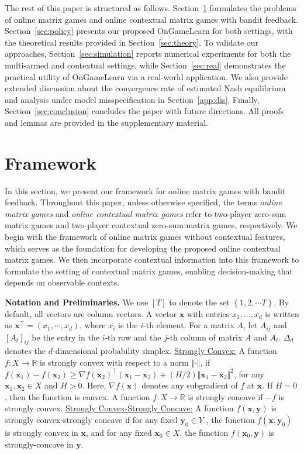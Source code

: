 \documentclass[12pt]{article}
\begin{document}
The rest of this paper is structured as follows. Section~\ref{sec:framework} formulates the problems of online matrix games and online contextual matrix games with bandit feedback. Section~\ref{sec:policy} presents our proposed OnGameLearn for both settings, with the theoretical results provided in Section~\ref{sec:theory}. To validate our approaches, Section~\ref{sec:simulation} reports numerical experiments for both the multi-armed and contextual settings, while Section~\ref{sec:real} demonstrates the practical utility of OnGameLearn via a real-world application. 
We also provide extended discussion about the convergence rate of estimated Nash equilibrium and analysis under model misspecification in Section~\ref{app:dis}.
Finally, Section~\ref{sec:conclusion} concludes the paper with future directions. All proofs and lemmas are provided in the supplementary material.



\section{Framework}
\label{sec:framework}

In this section, we present our framework for online matrix games with bandit feedback. Throughout this paper, unless otherwise specified, the terms \textit{online matrix games} and \textit{online contextual matrix games} refer to two-player zero-sum matrix games and two-player contextual zero-sum matrix games, respectively. We begin with the framework of online matrix games without contextual features, which serves as the foundation for developing the proposed online contextual matrix games. We then incorporate contextual information into this framework to formulate the setting of contextual matrix games, enabling decision-making that depends on observable contexts.

\smallskip
\noindent\textbf{Notation and Preliminaries.} We use $[T]$ to denote the set $\left\{1, 2, \cdots T\right\}$. By default, all vectors are column vectors. A vector $\bm{x}$ with entries $x_1, ..., x_d$ is written as $\bm{x}^\top = (x_1, \cdots, x_d)$, where $x_i$ is the $i$-th element. For a matrix $A$, let $A_{ij}$ and $[A_t]_{ij}$ be the entry in the $i$-th row and the $j$-th column of matrix $A$ and $A_t$. $\Delta_d$ denotes the $d$-dimensional probability simplex. \underline{Strongly Convex:} A function $f:X\rightarrow \mathbb{R}$ is strongly convex with respect to a norm $\Vert \cdot \Vert$, if  $f(\bm{x}_1) - f(\bm{x}_2) \ge \nabla f(\bm{x}_2)^\top (\bm{x}_1-\bm{x}_2)+({H}/{2} )\Vert \bm{x}_1-\bm{x}_2\Vert^2$, for any $\bm{x}_1, \bm{x}_2 \in X$ and $H>0$. Here, $\nabla f(\bm{x})$ denotes any subgradient of $f$ at $\bm{x}$. If $H=0$, then the function is convex. A function $f:X\rightarrow \mathbb{R}$ is strongly concave if $-f$ is strongly convex.  
\underline{Strongly Convex-Strongly Concave:}
A function $f(\bm{x}, \bm{y})$ is strongly convex-strongly concave if for any fixed $\bm{y}_0 \in Y$ , the function $f(\bm{x}, \bm{y}_0)$ is strongly convex in $\bm{x}$, and for any fixed $\bm{x}_0 \in X$, the function $f(\bm{x}_0, \bm{y})$ is strongly-concave in $\bm{y}$.
\end{document}
